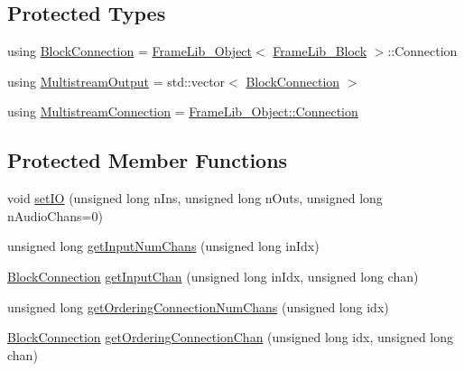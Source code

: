 \subsection*{Protected Types}
\begin{DoxyCompactItemize}
\item 
using \hyperlink{class_frame_lib___multistream_a611f70443aaa3eb2205f578c0882c469}{Block\+Connection} = \hyperlink{class_frame_lib___object}{Frame\+Lib\+\_\+\+Object}$<$ \hyperlink{class_frame_lib___block}{Frame\+Lib\+\_\+\+Block} $>$\+::Connection
\item 
using \hyperlink{class_frame_lib___multistream_a8844d112881e04687989f697a9337b11}{Multistream\+Output} = std\+::vector$<$ \hyperlink{class_frame_lib___multistream_a611f70443aaa3eb2205f578c0882c469}{Block\+Connection} $>$
\item 
using \hyperlink{class_frame_lib___multistream_ab8c2c075b15353a370d386f546e51bb6}{Multistream\+Connection} = \hyperlink{struct_frame_lib___object_1_1_connection}{Frame\+Lib\+\_\+\+Object\+::\+Connection}
\end{DoxyCompactItemize}
\subsection*{Protected Member Functions}
\begin{DoxyCompactItemize}
\item 
void \hyperlink{class_frame_lib___multistream_a3de7fa55fbe51575695527d057d5ea90}{set\+IO} (unsigned long n\+Ins, unsigned long n\+Outs, unsigned long n\+Audio\+Chans=0)
\item 
unsigned long \hyperlink{class_frame_lib___multistream_a50c911473af911e3d68cc7d5c80d0eb1}{get\+Input\+Num\+Chans} (unsigned long in\+Idx)
\item 
\hyperlink{class_frame_lib___multistream_a611f70443aaa3eb2205f578c0882c469}{Block\+Connection} \hyperlink{class_frame_lib___multistream_ac332ef6ed5f96ba902b708e727f98936}{get\+Input\+Chan} (unsigned long in\+Idx, unsigned long chan)
\item 
unsigned long \hyperlink{class_frame_lib___multistream_a2dabe16e18ce27dcb9d841bf7f651c3d}{get\+Ordering\+Connection\+Num\+Chans} (unsigned long idx)
\item 
\hyperlink{class_frame_lib___multistream_a611f70443aaa3eb2205f578c0882c469}{Block\+Connection} \hyperlink{class_frame_lib___multistream_a5632158bb34ae2f0fb8c501c1b1ef95a}{get\+Ordering\+Connection\+Chan} (unsigned long idx, unsigned long chan)
\end{DoxyCompactItemize}
